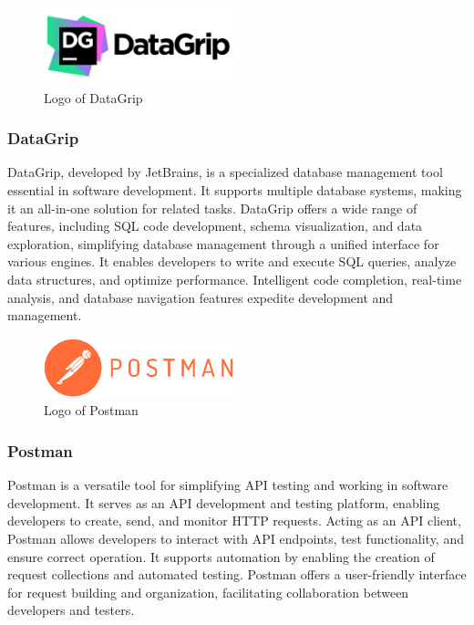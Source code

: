 \documentclass[conference]{IEEEtran}
\begin{document}
        \begin{figure}[htbp]
        \centerline{\includegraphics[width=5.5cm]{Images/logo/datagrip.png}}
        \label{fig}
        \caption{Logo of DataGrip}
        \end{figure}
        \subsubsection{DataGrip}
        DataGrip, developed by JetBrains, is a specialized database management tool essential in software development. It supports multiple database systems, making it an all-in-one solution for related tasks. DataGrip offers a wide range of features, including SQL code development, schema visualization, and data exploration, simplifying database management through a unified interface for various engines. It enables developers to write and execute SQL queries, analyze data structures, and optimize performance. Intelligent code completion, real-time analysis, and database navigation features expedite development and management.\\

        \begin{figure}[htbp]
        \centerline{\includegraphics[width=5.5cm]{Images/logo/postman.png}}
        \label{fig}
        \caption{Logo of Postman}
        \end{figure}
        \subsubsection{Postman}
        Postman is a versatile tool for simplifying API testing and working in software development. It serves as an API development and testing platform, enabling developers to create, send, and monitor HTTP requests. Acting as an API client, Postman allows developers to interact with API endpoints, test functionality, and ensure correct operation. It supports automation by enabling the creation of request collections and automated testing. Postman offers a user-friendly interface for request building and organization, facilitating collaboration between developers and testers.\\
\end{document}
